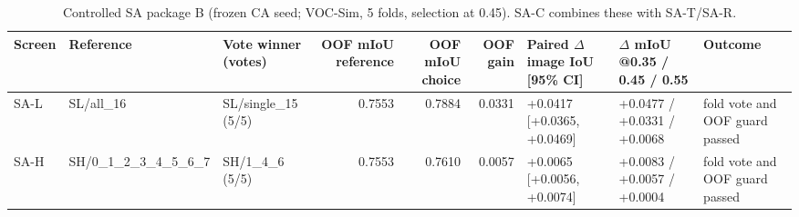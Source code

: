 \begin{table}[H]\centering\scriptsize\setlength{\tabcolsep}{3pt}
\begin{tabular}{>{\raggedright\arraybackslash}p{1.40cm}>{\raggedright\arraybackslash}p{1.40cm}>{\raggedright\arraybackslash}p{1.40cm}rrr>{\raggedright\arraybackslash}p{1.40cm}>{\raggedright\arraybackslash}p{1.40cm}>{\raggedright\arraybackslash}p{1.42cm}}
\toprule
Screen & Reference & Vote winner (votes) & OOF mIoU reference & OOF mIoU choice & OOF gain & Paired $\Delta$ image IoU [95\% CI] & $\Delta$ mIoU @0.35 /\allowbreak{} 0.45 /\allowbreak{} 0.55 & Outcome \\
\midrule
SA-L & SL/\allowbreak{}all\_\allowbreak{}16 & SL/\allowbreak{}single\_\allowbreak{}15 (5/\allowbreak{}5) & 0.7553 & 0.7884 & 0.0331 & +0.0417 [+0.0365, +0.0469] & +0.0477 /\allowbreak{} +0.0331 /\allowbreak{} +0.0068 & fold vote and OOF guard passed \\
SA-H & SH/\allowbreak{}0\_\allowbreak{}1\_\allowbreak{}2\_\allowbreak{}3\_\allowbreak{}4\_\allowbreak{}5\_\allowbreak{}6\_\allowbreak{}7 & SH/\allowbreak{}1\_\allowbreak{}4\_\allowbreak{}6 (5/\allowbreak{}5) & 0.7553 & 0.7610 & 0.0057 & +0.0065 [+0.0056, +0.0074] & +0.0083 /\allowbreak{} +0.0057 /\allowbreak{} +0.0004 & fold vote and OOF guard passed \\
\bottomrule
\end{tabular}
\caption{Controlled SA package B (frozen CA seed; VOC-Sim, 5 folds, selection at 0.45). SA-C combines these with SA-T/\allowbreak{}SA-R.}\label{tab:a4_cv_summary}
\end{table}
